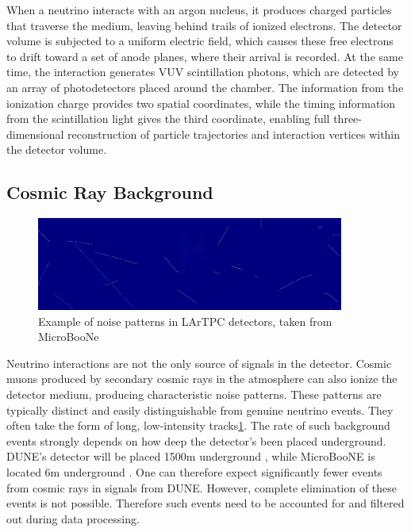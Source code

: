 \documentclass{pracalicmgr}
\begin{document}
When a neutrino interacts with an argon nucleus, it produces charged particles that traverse the medium, leaving behind trails of ionized electrons. The detector volume is subjected to a uniform electric field, which causes these free electrons to drift toward a set of anode planes, where their arrival is recorded. At the same time, the interaction generates VUV scintillation photons, which are detected by an array of photodetectors placed around the chamber. The information from the ionization charge provides two spatial coordinates, while the timing information from the scintillation light gives the third coordinate, enabling full three-dimensional reconstruction of particle trajectories and interaction vertices within the detector volume.

\subsection{Cosmic Ray Background}

\begin{figure}[H]
    \centering
    \includegraphics[width=0.9\textwidth]{src/wireimageIM.png}
    \caption{Example of noise patterns in LArTPC detectors, taken from MicroBooNe \cite{ubooneOpenSamples}}
    \label{fig:noise}
\end{figure}

Neutrino interactions are not the only source of signals in the detector. Cosmic muons produced by secondary cosmic rays in the atmosphere can also ionize the detector medium, producing characteristic noise patterns. These patterns are typically distinct and easily distinguishable from genuine neutrino events. They often take the form of long, low-intensity tracks\ref{fig:noise}. The rate of such background events strongly depends on how deep the detector's been placed underground. DUNE's detector will be placed 1500m underground \cite{DUNE}, while MicroBooNE is located 6m underground \cite{MicroBooNEDesign}. One can therefore expect significantly fewer events from cosmic rays in signals from DUNE. However, complete elimination of these events is not possible. Therefore such events need to be accounted for and filtered out during data processing.
\end{document}
